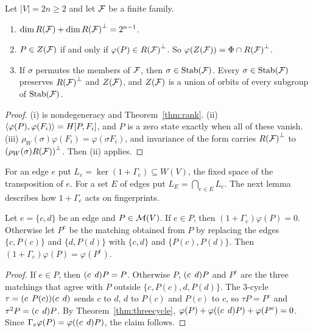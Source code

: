 \begin{theorem}\label{thm:polarsection}
Let $|V|=2n\ge2$ and let $\mathcal{F}$ be a finite family.
\begin{enumerate}
\item $\dim R(\mathcal{F})+\dim {R(\mathcal{F})}^\perp=2^{n-1}$.
\item $P\in Z(\mathcal{F})$ if and only if $\varphi(P)\in {R(\mathcal{F})}^\perp$. So $\varphi(Z(\mathcal{F}))=\Phi\cap {R(\mathcal{F})}^\perp$.
\item If $\sigma$ permutes the members of $\mathcal{F}$, then $\sigma\in\mathrm{Stab}(\mathcal{F})$. Every $\sigma\in\mathrm{Stab}(\mathcal{F})$ preserves ${R(\mathcal{F})}^\perp$ and $Z(\mathcal{F})$, and $Z(\mathcal{F})$ is a union of orbits of every subgroup of $\mathrm{Stab}(\mathcal{F})$.
\end{enumerate}
\end{theorem}

\begin{proof}
(i) is nondegeneracy and Theorem~\ref{thm:rank}. (ii) $\langle\varphi(P),\varphi(F_i)\rangle=H[P,F_i]$, and $P$ is a zero state exactly when all of these vanish. (iii) $\rho_W(\sigma)\varphi(F_i)=\varphi(\sigma F_i)$, and invariance of the form carries ${R(\mathcal{F})}^\perp$ to ${(\rho_W(\sigma)R(\mathcal{F}))}^\perp$. Then (ii) applies.
\end{proof}

For an edge $e$ put $L_e=\ker(1+\Gamma_e)\subseteq W(V)$, the fixed space of the transposition of $e$. For a set $E$ of edges put $L_E=\bigcap_{e\in E}L_e$. The next lemma describes how $1+\Gamma_e$ acts on fingerprints.

\begin{lemma}\label{lem:surgery}
Let $e=\{c,d\}$ be an edge and $P\in\mathcal{M}(V)$. If $e\in P$, then $(1+\Gamma_e)\varphi(P)=0$. Otherwise let $P^e$ be the matching obtained from $P$ by replacing the edges $\{c,P(c)\}$ and $\{d,P(d)\}$ with $\{c,d\}$ and $\{P(c),P(d)\}$. Then $(1+\Gamma_e)\varphi(P)=\varphi(P^e)$.
\end{lemma}

\begin{proof}
If $e\in P$, then $(c\;\,d)P=P$. Otherwise $P$, $(c\;\,d)P$ and $P^e$ are the three matchings that agree with $P$ outside $\{c,P(c),d,P(d)\}$. The $3$-cycle $\tau=(c\;\,P(c))(c\;\,d)$ sends $c$ to $d$, $d$ to $P(c)$ and $P(c)$ to $c$, so $\tau P=P^e$ and $\tau^2P=(c\;\,d)P$. By Theorem~\ref{thm:threecycle}, $\varphi(P)+\varphi((c\;\,d)P)+\varphi(P^e)=0$. Since $\Gamma_e\varphi(P)=\varphi((c\;\,d)P)$, the claim follows.
\end{proof}

